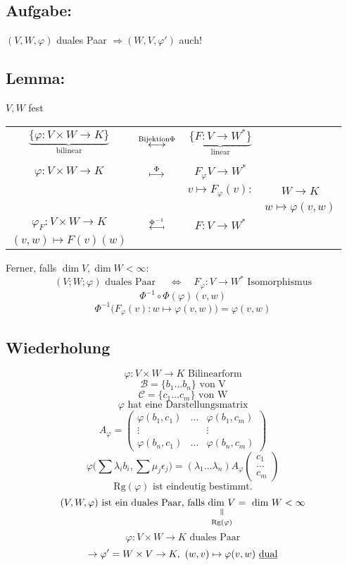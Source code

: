\documentclass[titlepage,12pt,a4paper,ngerman]{report}
\newcommand{\verteq}{\rotatebox{90}{$\,=$}}
\newcommand{\equalto}[2]{\underset{\scriptstyle\overset{\mkern4mu\verteq}{#2}}{#1}}
\newcommand{\tx}[1]{\textrm{#1}}
\newcommand{\ub}[1]{\underbrace{#1}}
\begin{document}
\subsection*{Aufgabe:}
$ (V,W,\varphi) $ duales Paar $ \Rightarrow (W,V,\varphi') $ auch!
\subsection{Lemma:} $ V,W $ fest
\begin{center}
	\begin{tabular}{cccc}
		$ \ub{\{\varphi: V\times W \to K \}}_{\tx{bilinear}} $ & $ \buildrel \tx{Bijektion} \Phi \over \longleftrightarrow$ & $ \ub{\{F: V \to W^*\}}_{\tx{linear}} $ & $  $\\
		\\
		$ \varphi: V \times W \to K $ & $ \buildrel \Phi \over \longmapsto $ & $ F_\varphi V \to W^* $ & $  $\\
		$  $ & $  $ & $ v \mapsto F_\varphi (v) : $ & $ W \to K $\\
		$  $ & $  $ & $  $ & $ w \mapsto \varphi(v,w) $\\
		$ \varphi_F : V \times W \to K $ & $ \buildrel \Phi ^{-1} \over{\reflectbox{$\longmapsto$}}$ & $ F: V \to W^* $ & $  $\\
		$ (v,w) \mapsto F(v)(w) $ & $  $ & $  $ & $  $\\
	\end{tabular}
\end{center}
Ferner, falls $ \dim V, \dim W < \infty $:\\
$$ (V;W;\varphi) \tx{ duales Paar } \quad \Leftrightarrow \quad F_\varphi : V \to W^* \tx{ Isomorphismus}$$
$$\Phi^{-1} \circ \Phi (\varphi)(v,w)$$
$$\Phi^{-1}\bigg(F_\varphi(v):w\mapsto\varphi(v,w)\bigg) = \varphi(v,w)$$   


\subsection{Wiederholung}
$$\varphi: V \times W \to K \tx{ Bilinearform}$$
$$\mathcal B = \{b_1 \dots b_n\} \tx{ von V}$$
$$\mathcal C = \{c_1 \dots c_m\} \tx{ von W}$$
$$\varphi \tx{ hat eine Darstellungsmatrix}$$
$$A_\varphi = 
\begin{pmatrix}
\varphi(b_1, c_1) & \dots & \varphi(b_1, c_m) \\
\vdots & & \vdots \\
\varphi(b_n, c_1) & \dots & \varphi(b_n, c_m)	
\end{pmatrix}$$
$$\varphi \bigg( \sum \lambda_i b_i, \sum \mu_j \epsilon_j \bigg) = (\lambda_1 \dots \lambda_n) A_\varphi \begin{pmatrix} c_1 \\ \dots \\ c_m \end{pmatrix}$$
$$\tx{Rg}(\varphi) \tx{ ist eindeutig bestimmt.}$$
$$(V, W, \varphi) \tx{ ist ein duales Paar, falls } \equalto{\tx{dim } V}{\tx{Rg}(\varphi)} = \tx{ dim } W < \infty$$
$$ \varphi: V \times W \to K \tx{ duales Paar}$$
$$\rightarrow \varphi' = W \times V \to K,\ (w,v) \mapsto \varphi(v,w) \tx{ \underline{dual}}$$
\end{document}
